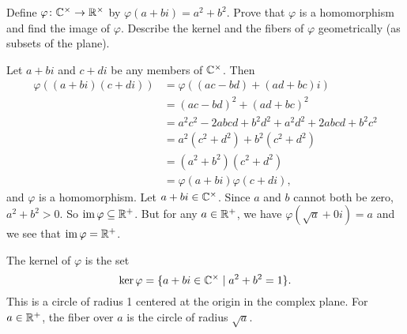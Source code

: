  Define $\varphi\colon\mathbb{C}^\times\to\mathbb{R}^\times$ by
$\varphi(a + bi) = a^2 + b^2$. Prove that $\varphi$ is a homomorphism
and find the image of $\varphi$. Describe the kernel and the fibers of
$\varphi$ geometrically (as subsets of the plane).
\begin{solution}
  Let $a + bi$ and $c + di$ be any members of $\mathbb{C}^\times$. Then
  \begin{align*}
    \varphi((a + bi)(c + di))
    &= \varphi((ac - bd) + (ad + bc)i) \\
    &= (ac - bd)^2 + (ad + bc)^2 \\
    &= a^2c^2 - 2abcd + b^2d^2 + a^2d^2 + 2abcd + b^2c^2 \\
    &= a^2(c^2 + d^2) + b^2(c^2 + d^2) \\
    &= (a^2 + b^2)(c^2 + d^2) \\
    &= \varphi(a + bi)\varphi(c + di),
  \end{align*}
  and $\varphi$ is a homomorphism. Let $a+bi\in\mathbb{C}^\times$. Since $a$
  and $b$ cannot both be zero, $a^2 + b^2 > 0$. So
  $\operatorname{im}\varphi\subseteq\mathbb{R}^+$. But for any $a\in\mathbb{R}^+$, we have
  $\varphi(\sqrt{a} + 0i) = a$ and we see that $\operatorname{im}\varphi = \mathbb{R}^+$.

  The kernel of $\varphi$ is the set
  \begin{equation*}
    \ker\varphi = \{a + bi\in\mathbb{C}^\times \mid a^2 + b^2 = 1\}.
  \end{equation*}
  This is a circle of radius 1 centered at the origin in the complex
  plane. For $a\in\mathbb{R}^+$, the fiber over $a$ is the circle of radius
  $\sqrt{a}$.
\end{solution}

